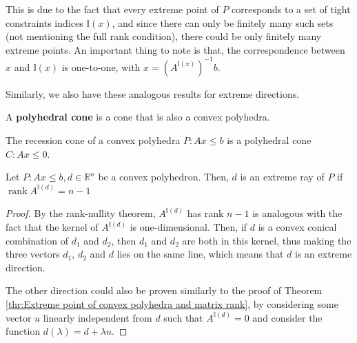 This is due to the fact that every extreme point of \( P \) corresponds to a set
of tight constraints indices \( \mathbb{I}(x) \), and since there can only be
finitely many such sets (not mentioning the full rank condition), there could
be only finitely many extreme points. An important thing to note is that, the
correspondence between \( x \) and \( \mathbb{I}(x) \) is one-to-one, with \( x
= \left(  A^{\mathbb{I}(x)} \right)^{-1}b\).

Similarly, we also have these analogous results for extreme directions.

\begin{definition}
\label{def:Polyhedral cone}
  A \textbf{polyhedral cone} is a cone that is also a convex polyhedra.
\end{definition}

\begin{theorem}
\label{thr:Recession cone of a convex polyhedra is polyhedral}
  The recession cone of a convex polyhedra \( P: Ax \le  b \) is a polyhedral
  cone \( C: Ax \le 0 \).
\end{theorem}

\begin{theorem}
\label{thr:Extreme directions of convex polyhedra and matrix rank}
  Let \( P: Ax \le  b, d \in \mathbb{R}^{n} \) be a convex polyhedron.
  Then, \( d \) is an extreme
  ray of \( P \) if \( \operatorname{rank} A^{\mathbb{I}(d)} = n - 1 \)
\end{theorem}

\begin{proof}
  By the rank-nullity theorem, \( A^{\mathbb{I}(d)} \) has rank \( n - 1 \) is
  analogous with the fact that the kernel of \( A^{\mathbb{I}(d)} \) is
  one-dimensional. Then, if \( d \) is a convex conical combination of \( d_{1}
  \) and \( d_{2} \), then \( d_{1} \) and \( d_{2} \) are both in this kernel,
  thus making the three vectors \( d_{1} \), \( d_{2} \) and \( d \) lies on the
  same line, which means that \( d \) is an extreme direction.

  The other direction could also be proven similarly to the proof of Theorem
  \ref{thr:Extreme point of convex polyhedra and matrix rank}, by considering
  some vector \(
  u\) linearly independent from \( d \) such that \( A^{\mathbb{I}(d)} = 0 \)
  and consider the function \( d(\lambda) = d + \lambda u \).
\end{proof}

\iffalse
